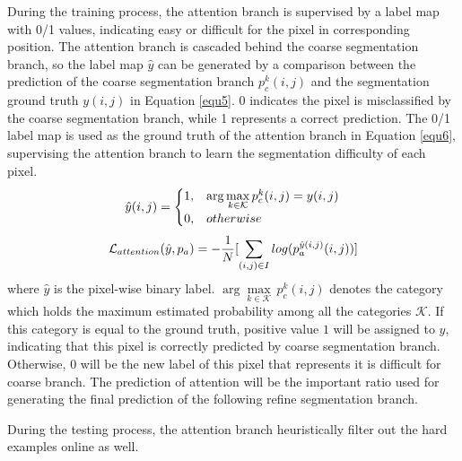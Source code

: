 \documentclass[10.5pt,compsoc]{TsT}
\theoremstyle{mystyle}
\begin{document}
{During the training process, the attention branch is supervised by a label map with 0/1 values, indicating  easy or difficult for the pixel in corresponding position. The attention branch is cascaded behind the coarse segmentation branch, so the label map $\hat{y}$ can be generated by a comparison between the prediction of the coarse segmentation branch $p_{c}^k(i,j)$ and the segmentation ground truth $y(i,j)$ in Equation \ref{equ5}. 0 indicates the pixel is misclassified by the coarse segmentation branch, while 1 represents a correct prediction. The 0/1 label map is used as the ground truth of the attention branch in Equation \ref{equ6}, supervising the attention branch to learn the segmentation difficulty of each pixel.
\begin{equation}\label{equ5}
\setlength\abovedisplayskip{8pt}
\setlength\belowdisplayskip{8pt}
\begin{split}
\hat{y}(i,j) = 
\begin{cases}
1, &\arg\underset{k \in \mathcal{K}}{\max}\,p_{c}^k(i,j)=y(i,j)\\
0, &otherwise
\end{cases}
\end{split}
\end{equation} 
\begin{equation}\label{equ6}
\setlength\abovedisplayskip{8pt}
\setlength\belowdisplayskip{8pt}
\begin{split}
\mathcal{L}_{attention}(\hat{y}, p_a) = - \frac{1}{N}[\sum_{(i,j)\in I}log(p^{\hat{y}(i,j)}_a(i,j))]\\
\end{split}
\end{equation}
where $\hat{y}$ is the pixel-wise binary label. $\arg\underset{k \in \mathcal{K}}{\max}\,p_{c}^k(i,j)$ denotes the category which holds the maximum estimated probability among all the categories $\mathcal{K}$. If this category is equal to the ground truth, positive value $1$ will be assigned to $\hat{y}$, indicating that this pixel is correctly predicted by coarse segmentation branch. Otherwise, $0$ will be the new label of this pixel that represents it is difficult for coarse branch. The prediction of attention will be the important ratio used for generating the final prediction of the following refine segmentation branch.

During the testing process, the attention branch heuristically filter out the hard examples online as well.



}
\end{document}
